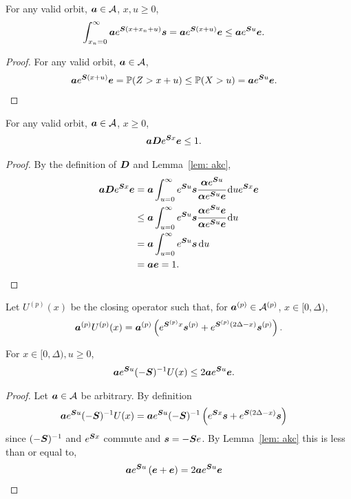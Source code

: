 \begin{lem}\label{lem: akc}
For any valid orbit, \(\boldsymbol a\in\mathcal A\), \(x,u\geq 0\), 
        \begin{align*}
        		\int_{x_n=0}^\infty \boldsymbol a e^{\boldsymbol{S}(x+x_n+u)}\boldsymbol s = \boldsymbol a e^{\boldsymbol{S}(x+u)}\boldsymbol e &\leq \boldsymbol a e^{\boldsymbol{S}u}\boldsymbol e. 
	\end{align*}
\end{lem}
\begin{proof}
	For any valid orbit, \(\boldsymbol a\in\mathcal A\), 
        \begin{align*}
        		\boldsymbol a e^{\boldsymbol{S}(x+u)}\boldsymbol e &= \mathbb P(Z>x+u) \leq\mathbb P(X>u) = \boldsymbol a e^{\boldsymbol Su} \boldsymbol e. 
	\end{align*}
\end{proof}
\begin{lem}\label{lem:macmnm}
	For any valid orbit, \(\boldsymbol a\in\mathcal A\), \(x\geq 0\), 
        \begin{align*}
        		\boldsymbol a\boldsymbol D e^{\boldsymbol{S}x}\boldsymbol e &\leq 1. 
	\end{align*}
\end{lem}
\begin{proof}
By the definition of \(\boldsymbol D\) and Lemma~\ref{lem: akc},
	\begin{align*}
        		\boldsymbol a\boldsymbol D e^{\boldsymbol{S}x}\boldsymbol e &= \boldsymbol a \int_{u=0}^\infty e^{\boldsymbol Su}\boldsymbol s\cfrac{\boldsymbol \alpha e^{\boldsymbol Su}}{\boldsymbol \alpha e^{\boldsymbol Su}\boldsymbol e}\, \mathrm{d} ue^{\boldsymbol{S}x}\boldsymbol e
		\\& \leq \boldsymbol a \int_{u=0}^\infty e^{\boldsymbol Su}\boldsymbol s\cfrac{\boldsymbol \alpha e^{\boldsymbol Su}\boldsymbol e}{\boldsymbol \alpha e^{\boldsymbol Su}\boldsymbol e}\, \mathrm{d} u
		\\& = \boldsymbol a \int_{u=0}^\infty e^{\boldsymbol Su}\boldsymbol s\, \mathrm{d} u
		\\& = \boldsymbol a \boldsymbol e = 1.
	\end{align*}
\end{proof}

Let \(U^{(p)}(x)\) be the closing operator such that, for \(\boldsymbol a^{(p)} \in\mathcal A^{(p)}\), \(x\in[0,\Delta)\),
\[\boldsymbol a^{(p)} U^{(p)}(x) = \boldsymbol a^{(p)} \left(e^{\boldsymbol{S}^{(p)}x}\boldsymbol s^{(p)} + e^{\boldsymbol{S}^{(p)}(2\Delta-x)}\boldsymbol s^{(p)}\right).\]
\begin{lem}\label{lem: akxnj}
	For \(x\in[0,\Delta),u\geq 0\),  
        \begin{align*}
        		\boldsymbol a   e^{\boldsymbol Su}(-\boldsymbol S)^{-1} U(x) &\leq 2 \boldsymbol a e^{\boldsymbol Su} \boldsymbol e.
	\end{align*}
\end{lem}
\begin{proof}
Let \(\boldsymbol a   \in \mathcal A\) be arbitrary. By definition 
	\begin{align*}
        		\boldsymbol a  e^{\boldsymbol Su}(-\boldsymbol S)^{-1} U(x) & = \boldsymbol a  e^{\boldsymbol Su}(-\boldsymbol S)^{-1}  \left(e^{\boldsymbol{S}x}\boldsymbol s + e^{\boldsymbol{S}(2\Delta-x)}\boldsymbol s\right)
	\end{align*}
	since \((-\boldsymbol S)^{-1}\) and \(e^{\boldsymbol Sx}\) commute and \(\boldsymbol s = -\boldsymbol S e\). 
	By Lemma~\ref{lem: akc} this is less than or equal to, 
	\begin{align}
        		& \boldsymbol a   e^{\boldsymbol Su} \left(\boldsymbol e + \boldsymbol e\right) = 2 \boldsymbol a   e^{\boldsymbol Su} \boldsymbol e \label{eqn:mzm}
	\end{align}
\end{proof}

